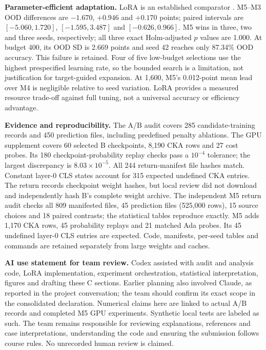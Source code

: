 \documentclass[a4paper,10pt]{article}
\begin{document}
\textbf{Parameter-efficient adaptation.} LoRA is an established comparator \cite{lora}. M5--M3 OOD differences are $-1.670$, $+0.946$ and $+0.170$ points; paired intervals are $[-5.060,1.720]$, $[-1.595,3.487]$ and $[-0.626,0.966]$. M5 wins in three, two and three seeds, respectively; all three exact Holm-adjusted $p$ values are 1.000. At budget 400, its OOD SD is 2.669 points and seed 42 reaches only 87.34\% OOD accuracy. This failure is retained. Four of five low-budget selections use the highest prespecified learning rate, so the bounded search is a limitation, not justification for target-guided expansion. At 1,600, M5's 0.012-point mean lead over M4 is negligible relative to seed variation. LoRA provides a measured resource trade-off against full tuning, not a universal accuracy or efficiency advantage.

\textbf{Evidence and reproducibility.} The A/B audit covers 285 candidate-training records and 450 prediction files, including predefined penalty ablations. The GPU supplement covers 60 selected B checkpoints, 8,190 CKA rows and 27 cost probes. Its 180 checkpoint-probability replay checks pass a $10^{-4}$ tolerance; the largest discrepancy is $8.03\times10^{-5}$. All 244 return-manifest file hashes match. Constant layer-0 CLS states account for 315 expected undefined CKA entries. The return records checkpoint weight hashes, but local review did not download and independently hash B's complete weight archive. The independent M5 return audit checks all 809 manifested files, 45 prediction files (525,000 rows), 15 source choices and 18 paired contrasts; the statistical tables reproduce exactly. M5 adds 1,170 CKA rows, 45 probability replays and 21 matched Ada probes. Its 45 undefined layer-0 CLS entries are expected. Code, manifests, per-seed tables and commands are retained separately from large weights and caches.

\textbf{AI use statement for team review.} Codex assisted with audit and analysis code, LoRA implementation, experiment orchestration, statistical interpretation, figures and drafting these C sections. Earlier planning also involved Claude, as reported in the project conversation; the team should confirm its exact scope in the consolidated declaration. Numerical claims here are linked to actual A/B records and completed M5 GPU experiments. Synthetic local tests are labeled as such. The team remains responsible for reviewing explanations, references and case interpretations, understanding the code and ensuring the submission follows course rules. No unrecorded human review is claimed.
\end{document}
